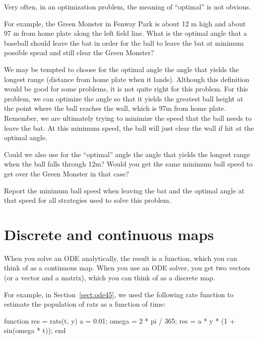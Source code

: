 \documentclass[
]{book}
\numberwithin{Answer}{chapter}
\numberwithin{Exercise}{chapter}
\begin{document}
\begin{ex}
Very often, in an optimization problem, the meaning of ``optimal'' is not obvious.

For example, the Green Monster in Fenway Park is about 12 m high and about 97
m from home plate along the left field line.
What is the optimal angle that a baseball should leave the bat in order
for the ball 
to leave the bat at minimum possible spead and still clear the Green Monster?

We may be tempted
to choose for the optimal angle the angle that yields the longest
range (distance from home plate when it lands).  
Although this definition would be good for some problems,
it is not quite right for this problem.  
For this problem, we can optimize the angle so that it
yields the greatest ball height at the point where
the ball reaches the wall, which is 97m from home plate.
Remember, we are ultimately trying to minimize
the speed that the ball needs to leave the bat.  At this minimum speed,
the ball will just clear the wall if hit at the optimal angle.

Could we also use for the ``optimal'' angle the 
angle that yields the longest range when the ball falls
through 12m?  Would you get the same minimum ball speed
to get over the Green Monster in that case?

Report the minimum ball speed when leaving the bat and the optimal angle
at that speed for all strategies used to solve this problem.
\end{ex}

\section{Discrete and continuous maps}

When you solve an ODE analytically, the result is a function,
which you can think of as a continuous map.  When you use an
ODE solver, you get two vectors (or a vector and a matrix), which
you can think of as a discrete map.

For example, in Section~\ref{sect:ode45}, we used the following rate
function to estimate the population of rats as a function of time:

\begin{code}
function res = rats(t, y)
    a = 0.01;
    omega = 2 * pi / 365;
    res = a * y * (1 + sin(omega * t));
end
\end{code}
\end{document}
